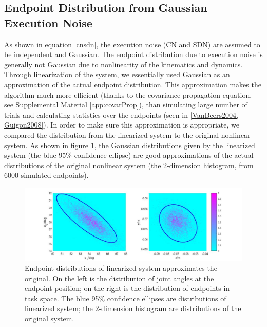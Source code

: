 \subsection{Endpoint Distribution from Gaussian Execution Noise}

As shown in equation \ref{cnsdn}, the execution noise (CN and SDN) are assumed to be independent and Gaussian. 
The endpoint distribution due to execution noise is generally not Gaussian due to nonlinearity of the kinematics and dynamics. 
Through linearization of the system, we essentially used Gaussian as an approximation of the actual endpoint distribution. 
This approximation makes the algorithm much more efficient (thanks to the covariance propagation equation, see Supplemental Material \ref{app:covarProp}), than simulating large number of trials and calculating statistics over the endpoints (seen in \ref{VanBeers2004, Guigon2008}).
In order to make sure this approximation is appropriate, we compared the distribution from the linearized system to the original nonlinear system. As shown in figure \ref{fig:linearizeddistributionapprox}, the Gaussian distributions given by the linearized system (the blue 95\% confidence ellipse) are good approximations of the actual distributions of the original nonlinear system (the 2-dimension histogram, from 6000 simulated endpoints).

\begin{figure}
	\centering
	\includegraphics[width=\linewidth]{figures/linearizedDistributionApprox}
	\caption[Endpoint distributions of linearized system approximates the original]{Endpoint distributions of linearized system approximates the original. On the left is the distribution of joint angles at the endpoint position; on the right is the distribution of endpoints in task space. The blue 95\% confidence ellipses are distributions of linearized system; the 2-dimension histogram are distributions of the original system.}
	\label{fig:linearizeddistributionapprox}
\end{figure}

